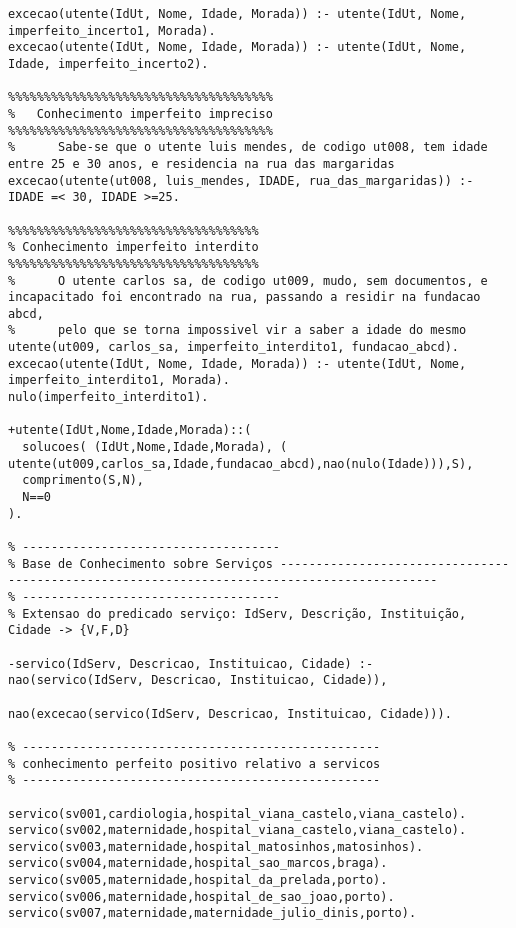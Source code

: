 \documentclass[
  oneside,
  10pt, a4paper,
  footinclude=true,
  headinclude=true,
  cleardoublepage=empty
]{scrbook}
\begin{document}
\begin{lstlisting}
excecao(utente(IdUt, Nome, Idade, Morada)) :- utente(IdUt, Nome, imperfeito_incerto1, Morada).
excecao(utente(IdUt, Nome, Idade, Morada)) :- utente(IdUt, Nome, Idade, imperfeito_incerto2).

%%%%%%%%%%%%%%%%%%%%%%%%%%%%%%%%%%%%%
%   Conhecimento imperfeito impreciso
%%%%%%%%%%%%%%%%%%%%%%%%%%%%%%%%%%%%%
%      Sabe-se que o utente luis mendes, de codigo ut008, tem idade entre 25 e 30 anos, e residencia na rua das margaridas
excecao(utente(ut008, luis_mendes, IDADE, rua_das_margaridas)) :- IDADE =< 30, IDADE >=25.

%%%%%%%%%%%%%%%%%%%%%%%%%%%%%%%%%%%
% Conhecimento imperfeito interdito
%%%%%%%%%%%%%%%%%%%%%%%%%%%%%%%%%%%
%      O utente carlos sa, de codigo ut009, mudo, sem documentos, e incapacitado foi encontrado na rua, passando a residir na fundacao abcd,
%      pelo que se torna impossivel vir a saber a idade do mesmo 
utente(ut009, carlos_sa, imperfeito_interdito1, fundacao_abcd).
excecao(utente(IdUt, Nome, Idade, Morada)) :- utente(IdUt, Nome, imperfeito_interdito1, Morada).
nulo(imperfeito_interdito1).

+utente(IdUt,Nome,Idade,Morada)::(
  solucoes( (IdUt,Nome,Idade,Morada), ( utente(ut009,carlos_sa,Idade,fundacao_abcd),nao(nulo(Idade))),S),
  comprimento(S,N),
  N==0
).

% ------------------------------------
% Base de Conhecimento sobre Serviços --------------------------------------------------------------------------------------------
% ------------------------------------
% Extensao do predicado serviço: IdServ, Descrição, Instituição, Cidade -> {V,F,D}

-servico(IdServ, Descricao, Instituicao, Cidade) :- nao(servico(IdServ, Descricao, Instituicao, Cidade)),
                                                    nao(excecao(servico(IdServ, Descricao, Instituicao, Cidade))).

% --------------------------------------------------
% conhecimento perfeito positivo relativo a servicos
% --------------------------------------------------

servico(sv001,cardiologia,hospital_viana_castelo,viana_castelo).
servico(sv002,maternidade,hospital_viana_castelo,viana_castelo).
servico(sv003,maternidade,hospital_matosinhos,matosinhos).
servico(sv004,maternidade,hospital_sao_marcos,braga).
servico(sv005,maternidade,hospital_da_prelada,porto).
servico(sv006,maternidade,hospital_de_sao_joao,porto).
servico(sv007,maternidade,maternidade_julio_dinis,porto).


\end{lstlisting}
\end{document}
